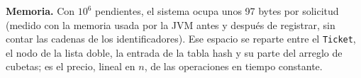 \textbf{Memoria.} Con $10^6$ pendientes, el sistema ocupa unos 97 bytes por
solicitud (medido con la memoria usada por la JVM antes y después de
registrar, sin contar las cadenas de los identificadores). Ese espacio se
reparte entre el \texttt{Ticket}, el nodo de la lista doble, la entrada de
la tabla hash y su parte del arreglo de cubetas; es el precio, lineal en
$n$, de las operaciones en tiempo constante.
